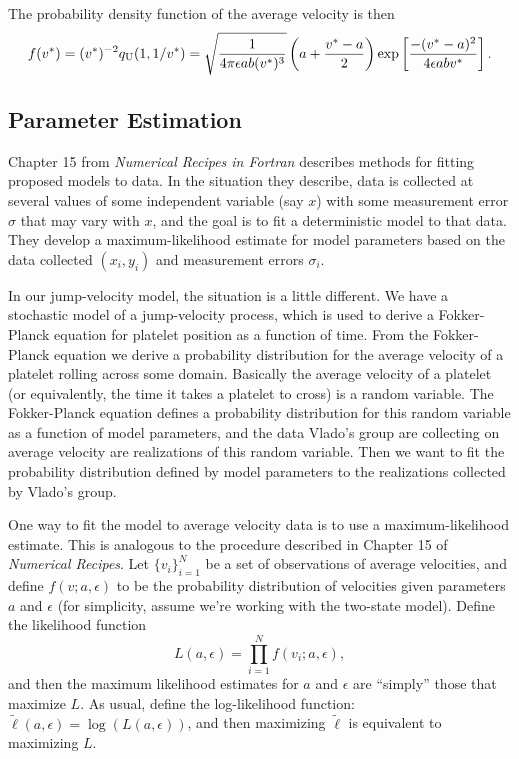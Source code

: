 \documentclass{article}
\newcommand{\tn}{\textnormal}
\begin{document}
The probability density function of the average velocity is then
\begin{equation}
  \label{eq:vel-dens}
  f(v^*) = (v^*)^{-2} q_\tn{U}(1, 1/v^*) = \sqrt{\frac{1}{4 \pi
      \epsilon a b (v^*)^3}}
  \left(a + \frac{v^* - a}{2} \right) \exp\left[ \frac{-(v^* -
      a)^2}{4\epsilon a b v^*} \right].
\end{equation}

\subsection{Parameter Estimation}
\label{sec:parameter-estimation}

Chapter 15 from \textit{Numerical Recipes in Fortran} describes
methods for fitting proposed models to data. In the situation they
describe, data is collected at several values of some independent
variable (say $x$) with some measurement error $\sigma$ that may vary
with $x$, and the goal is to fit a deterministic model to that
data. They develop a maximum-likelihood estimate for model parameters
based on the data collected $(x_i, y_i)$ and measurement errors
$\sigma_i$. 

In our jump-velocity model, the situation is a little different. We
have a stochastic model of a jump-velocity process, which is used to
derive a Fokker-Planck equation for platelet position as a function of
time. From the Fokker-Planck equation we derive a probability
distribution for the average velocity of a platelet rolling across
some domain. Basically the average velocity of a platelet (or
equivalently, the time it takes a platelet to cross) is a random
variable. The Fokker-Planck equation defines a probability
distribution for this random variable as a function of model
parameters, and the data Vlado's group are collecting on average
velocity are realizations of this random variable. Then we want to fit
the probability distribution defined by model parameters to the
realizations collected by Vlado's group.

One way to fit the model to average velocity data is to use a
maximum-likelihood estimate. This is analogous to the procedure
described in Chapter 15 of \textit{Numerical Recipes}. Let
$\{v_i\}_{i=1}^N$ be a set of observations of average velocities, and
define $f(v;a, \epsilon)$ to be the probability distribution of
velocities given parameters $a$ and $\epsilon$ (for simplicity, assume
we're working with the two-state model). Define the likelihood
function
\begin{equation}
  \label{eq:likelihood}
  L(a, \epsilon) = \prod_{i=1}^N f(v_i; a, \epsilon),
\end{equation}
and then the maximum likelihood estimates for $a$ and $\epsilon$ are
``simply'' those that maximize $L$. As usual, define the
log-likelihood function: $\tilde{\ell}(a, \epsilon) = \log(L(a, \epsilon))$,
and then maximizing $\tilde{\ell}$ is equivalent to maximizing $L$.
\end{document}
